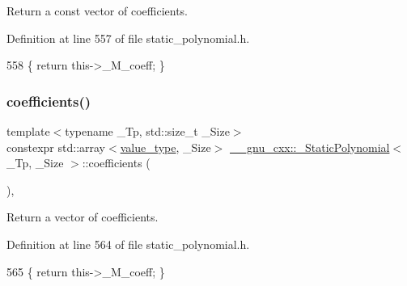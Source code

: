 Return a const vector of coefficients. 

Definition at line 557 of file static\+\_\+polynomial.\+h.


\begin{DoxyCode}
558       \{ \textcolor{keywordflow}{return} this->\_M\_coeff; \}
\end{DoxyCode}
\mbox{\label{class____gnu__cxx_1_1__StaticPolynomial_ab3c13a4b166e54bbb9c45fcfb16b2f00}} 
\subsubsection{\texorpdfstring{coefficients()}{coefficients()}\hspace{0.1cm}{\footnotesize\ttfamily [2/2]}}
{\footnotesize\ttfamily template$<$typename \+\_\+\+Tp, std\+::size\+\_\+t \+\_\+\+Size$>$ \\
constexpr std\+::array$<$\hyperlink{class____gnu__cxx_1_1__StaticPolynomial_aad5f3d6d5876b6926b30724aeac649d6}{value\+\_\+type}, \+\_\+\+Size$>$ \hyperlink{class____gnu__cxx_1_1__StaticPolynomial}{\+\_\+\+\_\+gnu\+\_\+cxx\+::\+\_\+\+Static\+Polynomial}$<$ \+\_\+\+Tp, \+\_\+\+Size $>$\+::coefficients (\begin{DoxyParamCaption}{ }\end{DoxyParamCaption})\hspace{0.3cm}{\ttfamily [inline]}, {\ttfamily [noexcept]}}

Return a vector of coefficients. 

Definition at line 564 of file static\+\_\+polynomial.\+h.


\begin{DoxyCode}
565       \{ \textcolor{keywordflow}{return} this->\_M\_coeff; \}
\end{DoxyCode}
\mbox{\label{class____gnu__cxx_1_1__StaticPolynomial_a2960cc96c78bf8b1b532d8d2a870ec63}} 

